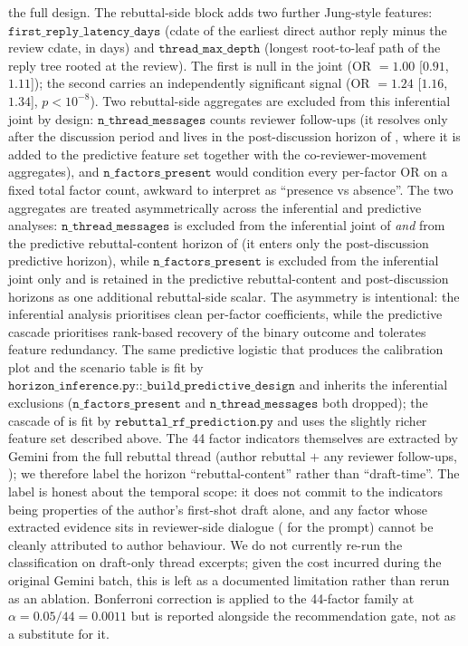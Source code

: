 \documentclass{article}
\newcommand{\code}[1]{\texttt{#1}}
\begin{document}
the full design. The rebuttal-side block adds two further Jung-style features: $\code{first\_reply\_latency\_days}$ (cdate of the earliest direct author reply minus the review cdate, in days) and $\code{thread\_max\_depth}$ (longest root-to-leaf path of the reply tree rooted at the review). The first is null in the joint (OR $=1.00$ [$0.91$, $1.11$]); the second carries an independently significant signal (OR $=1.24$ [$1.16$, $1.34$], $p < 10^{-8}$). Two rebuttal-side aggregates are excluded from this inferential joint by design: $\code{n\_thread\_messages}$ counts reviewer follow-ups (it resolves only after the discussion period and lives in the post-discussion horizon of , where it is added to the predictive feature set together with the co-reviewer-movement aggregates), and $\code{n\_factors\_present}$ would condition every per-factor OR on a fixed total factor count, awkward to interpret as ``presence vs absence''. The two aggregates are treated asymmetrically across the inferential and predictive analyses: $\code{n\_thread\_messages}$ is excluded from the inferential joint of  \emph{and} from the predictive rebuttal-content horizon of  (it enters only the post-discussion predictive horizon), while $\code{n\_factors\_present}$ is excluded from the inferential joint only and is retained in the predictive rebuttal-content and post-discussion horizons as one additional rebuttal-side scalar. The asymmetry is intentional: the inferential analysis prioritises clean per-factor coefficients, while the predictive cascade prioritises rank-based recovery of the binary outcome and tolerates feature redundancy. The same predictive logistic that produces the calibration plot and the scenario table is fit by $\code{horizon\_inference.py::\_build\_predictive\_design}$ and inherits the inferential exclusions ($\code{n\_factors\_present}$ and $\code{n\_thread\_messages}$ both dropped); the cascade of  is fit by $\code{rebuttal\_rf\_prediction.py}$ and uses the slightly richer feature set described above. The 44 factor indicators themselves are extracted by Gemini from the full rebuttal thread (author rebuttal $+$ any reviewer follow-ups, ); we therefore label the horizon ``rebuttal-content'' rather than ``draft-time''. The label is honest about the temporal scope: it does not commit to the indicators being properties of the author's first-shot draft alone, and any factor whose extracted evidence sits in reviewer-side dialogue ( for the prompt) cannot be cleanly attributed to author behaviour. We do not currently re-run the classification on draft-only thread excerpts; given the cost incurred during the original Gemini batch, this is left as a documented limitation rather than rerun as an ablation. Bonferroni correction is applied to the 44-factor family at $\alpha = 0.05/44 = 0.0011$ but is reported alongside the recommendation gate, not as a substitute for it.
\end{document}

